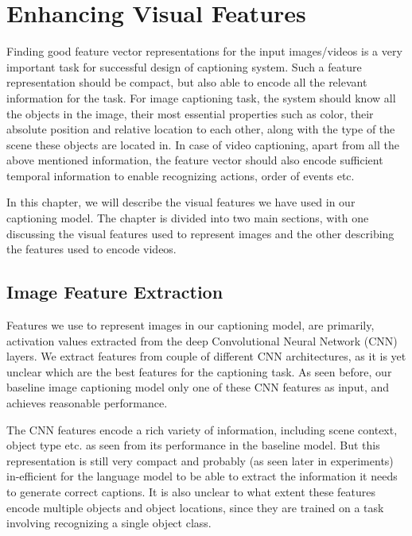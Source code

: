 \chapter{Enhancing Visual Features}
\label{chapter:VisFeatChapter}

Finding good feature vector representations for the input images/videos is a
very important task for successful design of captioning system.
Such a feature representation should be compact, but also able to encode all the
relevant information for the task. 
For image captioning task, the system should know all the objects in the image,
their most essential properties such as color, their absolute position and
relative location to each other, along with the type of the scene these objects
are located in.
In case of video captioning, apart from all the above mentioned information, the
feature vector should also encode sufficient temporal information to enable
recognizing actions, order of events etc.

In this chapter, we will describe the visual features we have used in
our captioning model.
The chapter is divided into two main sections, with one discussing the visual
features used to represent images and the other describing the features used to
encode videos.

\section{Image Feature Extraction}
\label{sec:ImageFeat}

Features we use to represent images in our captioning model, are primarily,
activation values extracted from the deep Convolutional Neural Network (CNN)
layers.
We extract features from couple of different CNN architectures, as it is yet
unclear which are the best features for the captioning task.
As seen before, our baseline image captioning model only one of these CNN
features as input, and achieves reasonable performance.


The CNN features encode a rich variety of information, including scene context,
object type etc. as seen from its performance in the baseline model.
But this representation is still very compact and probably (as seen later in
experiments) in-efficient for the language model to be able to extract the
information it needs to generate correct captions.
It is also unclear to what extent these features encode multiple objects and
object locations, since they are trained on a task involving recognizing a
single object class.

